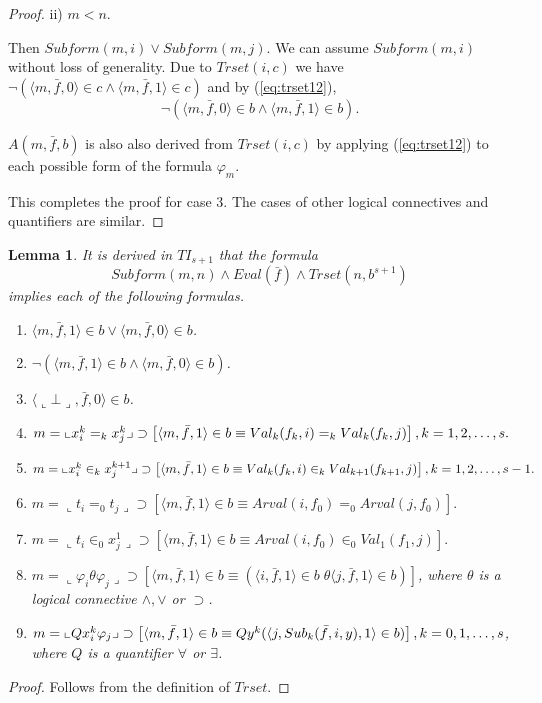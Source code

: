 \documentclass{asl}
\newtheorem{lemma}{Lemma}[section]
\theoremstyle{definition}
\begin{document}
\begin{proof}
ii) $m<n$.

Then $Subform(m,i)\vee Subform(m,j)$. We can assume $Subform(m,i)$ without loss of generality. Due to $Trset(i,c)$ we have $\neg(\langle m,\bar{f},0\rangle\in c\wedge\langle m,\bar{f},1\rangle\in c)$ and by (\ref{eq:trset12}), 
\[\neg(\langle m,\bar{f},0\rangle\in b\wedge\langle m,\bar{f},1\rangle\in b).\] 
 
$A( m,\bar{f},b)$ is also also derived from $Trset (i,c)$ by applying (\ref{eq:trset12}) to each possible form of the formula $\varphi_m$.

This completes the proof for case 3. The cases of other logical connectives and quantifiers are similar.
\end{proof}

\begin{lemma}
It is derived in $TI_{s+1}$ that the formula 
\[ Subform(m,n)\wedge Eval(\bar{f})\wedge Trset(n,b^{s+1})\]
implies each of the following formulas.
\begin{enumerate}
\item $\langle m,\bar{f},1 \rangle\in b \vee \langle  m,\bar{f},0 \rangle\in b$.
\medskip
\item $\neg (\langle m,\bar{f},1 \rangle\in b \wedge \langle m,\bar{f},0 \rangle \in b)$.
\medskip
\item $\langle \llcorner \bot \lrcorner,\bar{f},0 \rangle \in b$.
\medskip
\item $ m=\llcorner x_i^k=_k x_j^k\lrcorner 
\supset 
\left[\langle m,\bar{f},1\rangle\in b \equiv 
 Val_k(f_k,i)=_k Val_k(f_k,j)\right], 
\\ 
 k=1,2,\ldots,s.$
 \medskip
\item
$m=\llcorner x_i^k\in_k x_j^{k+1}\lrcorner 
\supset
\left[\langle m,\bar{f},1\rangle \in b \equiv Val_k(f_k,i)\in_k Val_{k+1}(f_{k+1},j)\right], 
\\
k=1,2,\ldots,s-1.$ 
\medskip
\item
$m=\llcorner t_i=_0 t_j\lrcorner \supset
\left[\langle m,\bar{f},1\rangle \in b \equiv Arval(i,f_0)=_0 Arval(j,f_0)\right]. $ 
\medskip
\item
$m=\llcorner t_i\in_0 x_j^1\lrcorner
\supset
\left[\langle m,\bar{f},1\rangle \in b \equiv Arval(i,f_0)\in_0 Val_1(f_1,j)\right].$ 
\medskip
\item
$m=\llcorner \varphi_i \theta \varphi_j\lrcorner \supset \left[\langle m,\bar{f},1\rangle \in b \equiv \left(\langle i,\bar{f},1\rangle \in b \;\theta \langle j,\bar{f},1\rangle \in b \right)  \right]$,  where $\theta$ is a logical connective $\wedge,\vee$ or $\supset$.
\medskip
\item
$m=\llcorner Q x_i^k \varphi_j\lrcorner \supset \left[\langle m,\bar{f},1\rangle \in b \equiv 
Qy^k(\langle j,Sub_k(\bar{f},i,y),1\rangle \in b )\right],
\\k=0,1,\ldots,s$, where $Q$ is a quantifier $\forall$ or $\exists$.
\end{enumerate}
\label{lemma:trset9}
\end{lemma}
\begin{proof}
Follows from the definition of $Trset$.
\end{proof}
\end{document}
